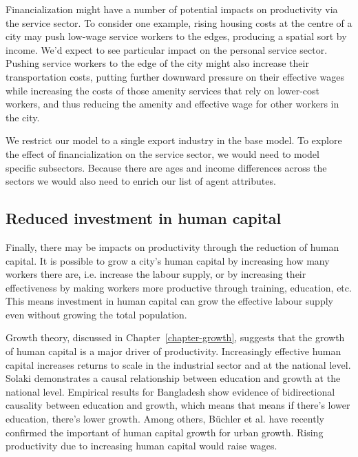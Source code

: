 Financialization might have a number of potential impacts on productivity via the service sector. To consider one example, rising housing costs at the centre of a city may push low-wage service workers to the edges, producing a spatial sort by income. We'd expect to see particular impact on the personal service sector. Pushing service workers to the edge of the city might also increase their transportation costs, putting further downward pressure on their effective wages while increasing the costs of those amenity services that rely on lower-cost workers, and thus reducing the amenity and effective wage for other workers in the city. 

We restrict our model to a single export industry in the base model. 
To explore the effect of financialization on the service sector, %
we would need to  model specific subsectors. Because there are ages and income differences across the sectors we would also need to enrich our list of agent attributes. 


\subsection{Reduced investment in human capital}
Finally, there may be impacts on productivity through the reduction of human capital. 
It is possible to grow a city's \gls{human capital} by increasing how many workers there are, i.e. increase the labour supply, or by increasing their effectiveness by making workers more productive through training, education, etc. %
This means investment in human capital can grow the \gls{effective labour supply} even without growing the total population.

Growth theory, discussed in Chapter~\ref{chapter-growth}, suggests that the growth of human capital is a major driver of productivity. Increasingly effective human capital increases returns to scale in the industrial sector and at the national level. 
Solaki \cite{solakiRelationshipEducationGDP2013} demonstrates a causal relationship between education and growth at the national level. Empirical results for Bangladesh \cite{islam2007relationship} show evidence of bidirectional causality between education and growth, which means that means if there's lower education, there's lower growth.  Among others, B\"uchler et al. \cite{buchlerImpactHumanCapital2024} have recently confirmed the important of human capital growth for urban growth.
Rising productivity due to increasing human capital would raise wages. %

